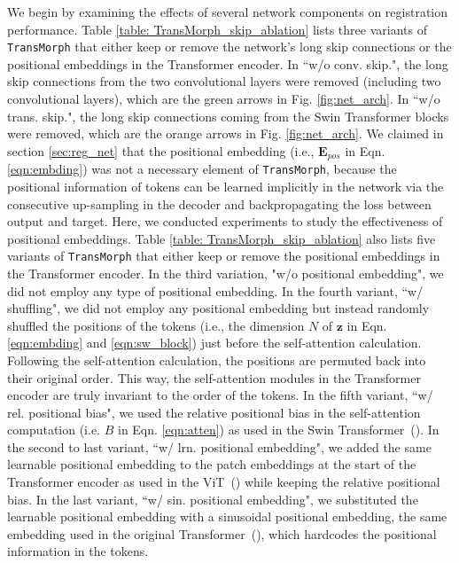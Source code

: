 \documentclass[times,twocolumn,final]{elsarticle}
\begin{document}
We begin by examining the effects of several network components on registration performance. Table \ref{table: TransMorph_skip_ablation} lists three variants of \texttt{TransMorph} that either keep or remove the network's long skip connections or the positional embeddings in the Transformer encoder. In ``w/o conv. skip.", the long skip connections from the two convolutional layers were removed (including two convolutional layers), which are the green arrows in Fig. \ref{fig:net_arch}. In ``w/o trans. skip.", the long skip connections coming from the Swin Transformer blocks were removed, which are the orange arrows in Fig. \ref{fig:net_arch}. We claimed in section \ref{sec:reg_net} that the positional embedding (i.e., $\mathbf{E}_{pos}$ in Eqn. \ref{eqn:embding}) was not a necessary element of \texttt{TransMorph}, because the positional information of tokens can be learned implicitly in the network via the consecutive up-sampling in the decoder and backpropagating the loss between output and target. Here, we conducted experiments to study the effectiveness of positional embeddings. Table \ref{table: TransMorph_skip_ablation} also lists five variants of \texttt{TransMorph} that either keep or remove the positional embeddings in the Transformer encoder. In the third variation, "w/o positional embedding", we did not employ any type of positional embedding. In the fourth variant, ``w/ shuffling", we did not employ any positional embedding but instead randomly shuffled the positions of the tokens (i.e., the dimension $N$ of $\mathbf{z}$ in Eqn. \ref{eqn:embding} and \ref{eqn:sw_block}) just before the self-attention calculation. Following the self-attention calculation, the positions are permuted back into their original order. This way, the self-attention modules in the Transformer encoder are truly invariant to the order of the tokens. In the fifth variant, ``w/ rel. positional bias", we used the relative positional bias in the self-attention computation (i.e. $B$ in Eqn. \ref{eqn:atten}) as used in the Swin Transformer~(\cite{liu2021swin}). In the second to last variant, ``w/ lrn. positional embedding", we added the same learnable positional embedding to the patch embeddings at the start of the Transformer encoder as used in the ViT~(\cite{dosovitskiy2020image}) while keeping the relative positional bias. In the last variant, ``w/ sin. positional embedding", we substituted the learnable positional embedding with a sinusoidal positional embedding, the same embedding used in the original Transformer~(\cite{vaswani2017attention}), which hardcodes the positional information in the tokens.
\end{document}
